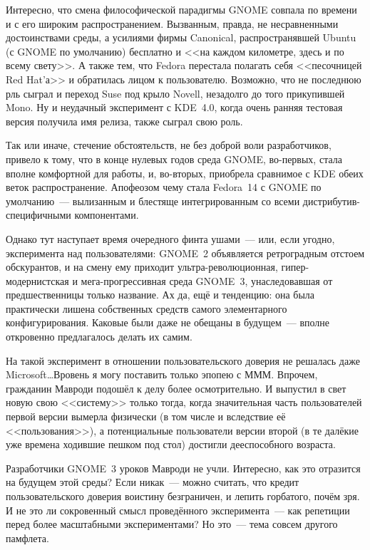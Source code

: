 Интересно, что смена философической парадигмы GNOME совпала по времени и с его широким распространением. Вызванным, правда, не несравненными достоинствами среды, а усилиями фирмы Canonical, распространявшей Ubuntu (с GNOME по умолчанию) бесплатно и <<на каждом километре, здесь и по всему свету>>. А также тем, что Fedora перестала полагать себя <<песочницей Red Hat'а>> и обратилась лицом к пользователю. Возможно, что не последнюю рль сыграл и переход Suse под крыло Novell, незадолго до того прикупившей Mono. Ну и неудачный эксперимент с KDE~4.0, когда очень ранняя тестовая версия получила имя релиза, также сыграл свою роль.

Так или иначе, стечение обстоятельств, не без доброй воли разработчиков, привело к тому, что в конце нулевых годов среда GNOME, во-первых, стала вполне комфортной для работы, и, во-вторых, приобрела сравнимое с KDE обеих веток распространение. Апофеозом чему стала Fedora~14 с GNOME по умолчанию~--- вылизанным и блестяще интегрированным со всеми дистрибутив-специфичными компонентами.

Однако тут наступает время очередного финта ушами~--- или, если угодно, эксперимента над пользователями: GNOME~2 объявляется ретроградным отстоем обскурантов, и на смену ему приходит ультра-революционная, гипер-модернистская и мега-прогрессивная среда GNOME~3, унаследовавшая от предшественницы только название. Ах да, ещё и тенденцию: она была практически лишена собственных средств самого элементарного конфигурирования. Каковые были даже не обещаны в будущем~--- вполне откровенно предлагалось делать их самим.

На такой эксперимент в отношении пользовательского доверия не решалась даже Microsoft\dots Вровень я могу поставить только эпопею с МММ. Впрочем, гражданин Мавроди подошёл к делу более осмотрительно. И выпустил в свет новую свою <<систему>> только тогда, когда значительная часть пользователей первой версии вымерла физически (в том числе и вследствие её <<пользования>>), а потенциальные пользователи версии второй (в те далёкие уже времена ходившие пешком под стол) достигли дееспособного возраста.

Разработчики GNOME~3 уроков Мавроди не учли. Интересно, как это отразится на будущем этой среды? Если никак~--- можно считать, что кредит пользовательского доверия воистину безграничен, и лепить горбатого, почём зря. И не это ли сокровенный смысл проведённого эксперимента~--- как репетиции перед более масштабными экспериментами? Но это~--- тема совсем другого памфлета.


